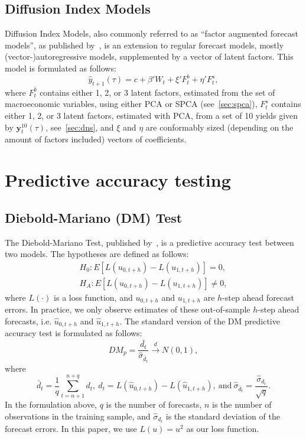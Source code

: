 \subsection{Diffusion Index Models}
\label{sec:dif}
Diffusion Index Models, also commonly referred to as \enquote{factor augmented forecast models}, as published by~\textcite[hereafter DIF]{stock_macroeconomic_2002,stock_forecasting_2002}, is an extension to regular forecast models, mostly (vector-)autoregressive models, supplemented by a vector of latent factors. 
This model is formulated as follows:
\begin{equation}
	\hat{y}_{t+1}(\tau) = c + \beta' W_t + \xi' F_t^b + \eta' F_t^s,
\end{equation}
where $F_t^b$ contains either 1, 2, or 3 latent factors, estimated from the set of macroeconomic variables, using either PCA or SPCA (see~\cref{sec:spca}), $F_t^s$ contains either 1, 2, or 3 latent factors, estimated with PCA, from a set of 10 yields given by $\mathbf{y}_t^{10}(\tau)$, see~\cref{sec:dns}, and $\xi$ and $\eta$ are conformably sized (depending on the amount of factors included) vectors of coefficients. 

\section{Predictive accuracy testing}
\subsection{Diebold-Mariano (DM) Test}
\label{sec:dmtest}
The Diebold-Mariano Test, published by~\textcite[hereafter DM]{diebold_comparing_1994}, is a predictive accuracy test between two models. 
The hypotheses are defined as follows:
\begin{align*}
	H_0 : E\left[L(u_{0,t+h}) - L(u_{1,t+h})\right] = 0, \\
	H_A : E\left[L(u_{0,t+h}) - L(u_{1,t+h})\right] \neq 0,
\end{align*}
where $L(\cdot)$ is a loss function, and $u_{0,t+h}$ and $u_{1,t+h}$ are $h$-step ahead forecast errors. 
In practice, we only observe estimates of these out-of-sample $h$-step ahead forecasts, i.e. $\hat{u}_{0,t+h}$ and $\hat{u}_{1,t+h}$. The standard version of the DM predictive accuracy test is formulated as follows:
\begin{equation}
	DM_p = \frac{\bar{d_t}}{\hat{\sigma}_{\bar{d}_t}} \overset{d}{\rightarrow} N(0,1),
\end{equation}
where
\begin{equation}
	\bar{d}_t = \frac{1}{q} \sum_{t=n+1}^{n+q} d_t,\ d_t = L(\hat{u}_{0,t+h}) - L(\hat{u}_{1,t+h}),\ \text{and}\ \hat{\sigma}_{\bar{d}_t} = \frac{\hat{\sigma}_{d_t}}{\sqrt{q}}.
\end{equation}
In the formulation above, $q$ is the number of forecasts, $n$ is the number of observations in the training sample, and $\hat{\sigma}_{d_t}$ is the standard deviation of the forecast errors. In this paper, we use $L(u) = u^2$ as our loss function.
